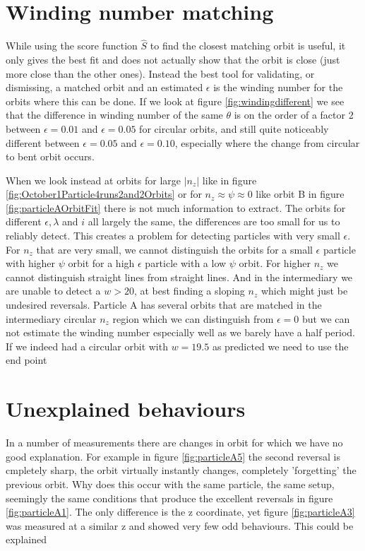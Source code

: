 \section{Winding number matching}
While using the score function $\hat{S}$ to find the closest matching orbit is useful, it only gives the best fit and 
does not actually show that the orbit is close (just more close than the other ones). Instead the best tool for 
validating, or dismissing, a matched orbit and an estimated $\epsilon$ is the winding number for the orbits where 
this can be done. If we look at figure \ref{fig:windingdifferent} we see that the difference in winding number of the 
same $\theta$ is on the order of a factor 2 between $\epsilon = 0.01$ and $\epsilon = 0.05$ for circular orbits, and 
still quite noticeably different between $\epsilon = 0.05$ and $\epsilon = 0.10$, especially where the change from 
circular to bent orbit occurs. 

When we look instead at orbits for large $\left| n_z \right|$ like in figure 
\ref{fig:October1Particle4runs2and2Orbits} or for $n_z \approx \psi \approx 0$ like orbit B in figure 
\ref{fig:particleAOrbitFit} there is not much information to extract. The orbits for different $\epsilon, \lambda$ 
and $i$ all largely the same, the differences are too small for us to reliably detect. This creates a problem for 
detecting particles with very small $\epsilon$. For $n_z$ that are very small, we cannot distinguish the orbits for a 
small $\epsilon$ particle with higher $\psi$ orbit for a high $\epsilon$ particle with a low $\psi$ orbit. For higher 
$n_z$ we cannot distinguish straight lines from straight lines. And in the intermediary we are unable to detect a $w 
> 20$, at best finding a sloping $n_z$ which might just be undesired reversals. Particle A has several orbits that 
are matched in the intermediary circular $n_z$ region which we can distinguish from $\epsilon = 0$ but we can not 
estimate the winding number especially well as we barely have a half period. If we indeed had a circular orbit with 
$w = 19.5$ as predicted we need to use the end point 


\section{Unexplained behaviours}
In a number of measurements there are changes in orbit for which we have no good explanation. For example in figure \ref{fig:particleA5} the second reversal is cmpletely sharp, the orbit virtually instantly changes, completely 'forgetting' the previous orbit. Why does this occur with the same particle, the same setup, seemingly the same conditions that produce the excellent reversals in figure \ref{fig:particleA1}. The only difference is the z coordinate, yet figure \ref{fig:particleA3} was measured at a similar z and showed very few odd behaviours. This could be explained

